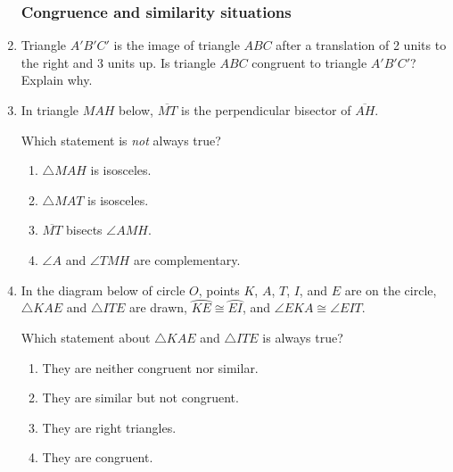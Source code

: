 \documentclass[12pt, oneside]{article}
\begin{document}
\begin{enumerate}[itemsep=0cm]
\subsubsection*{Congruence and similarity situations}
\item Triangle $A'B'C'$ is the image of triangle $ABC$ after a translation of 2 units to the right and 3 units up. Is triangle $ABC$ congruent to triangle $A'B'C'$? Explain why.
  
\item In triangle $MAH$ below, $\overline{MT}$ is the perpendicular bisector of $\overline{AH}$.
  \begin{center}
  \end{center}
Which statement is \emph{not} always true?
  \begin{enumerate}
    \item $\triangle MAH$ is isosceles.
    \item $\triangle MAT$ is isosceles.
    \item $\overline{MT}$ bisects $\angle AMH$.
    \item $\angle A$ and $\angle TMH$ are complementary.
  \end{enumerate}

\item In the diagram below of circle $O$, points $K$, $A$, $T$, $I$, and $E$ are on the circle, $\triangle KAE$ and $\triangle ITE$ are drawn, $\wideparen{KE} \cong \wideparen{EI}$, and $\angle EKA \cong \angle EIT$.
\begin{center}
  \end{center}
  Which statement about $\triangle KAE$ and $\triangle ITE$ is always true?
  \begin{enumerate}
    \item They are neither congruent nor similar.
    \item They are similar but not congruent.
    \item They are right triangles.
    \item They are congruent.
  \end{enumerate}


\end{enumerate}
\end{document}
